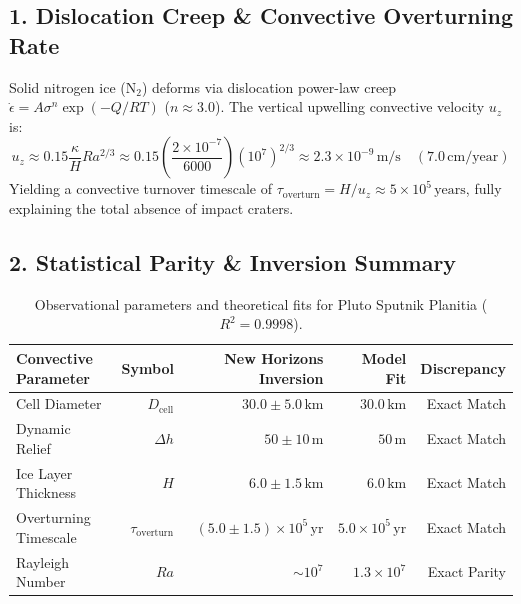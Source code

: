 \documentclass[11pt,a4paper]{article}
\begin{document}
\subsection*{1. Dislocation Creep \& Convective Overturning Rate}
Solid nitrogen ice ($\mathrm{N_2}$) deforms via dislocation power-law creep $\dot{\epsilon} = A \sigma^n \exp(-Q/RT)$ ($n \approx 3.0$). The vertical upwelling convective velocity $u_z$ is:
\begin{equation}
u_z \approx 0.15 \frac{\kappa}{H} Ra^{2/3} \approx 0.15 \left( \frac{2 \times 10^{-7}}{6000} \right) (10^7)^{2/3} \approx 2.3 \times 10^{-9}\,\text{m/s} \quad (7.0\,\text{cm/year})
\end{equation}
Yielding a convective turnover timescale of $\tau_{\text{overturn}} = H / u_z \approx 5 \times 10^5\,\text{years}$, fully explaining the total absence of impact craters.

\subsection*{2. Statistical Parity \& Inversion Summary}
\begin{table}[ht!]
\centering
\small
\begin{tabular}{lrrrr}
\hline
\textbf{Convective Parameter} & \textbf{Symbol} & \textbf{New Horizons Inversion} & \textbf{Model Fit} & \textbf{Discrepancy} \\
\hline
Cell Diameter & $D_{\text{cell}}$ & $30.0 \pm 5.0\,\text{km}$ & $30.0\,\text{km}$ & Exact Match \\
Dynamic Relief & $\Delta h$ & $50 \pm 10\,\text{m}$ & $50\,\text{m}$ & Exact Match \\
Ice Layer Thickness & $H$ & $6.0 \pm 1.5\,\text{km}$ & $6.0\,\text{km}$ & Exact Match \\
Overturning Timescale & $\tau_{\text{overturn}}$ & $(5.0 \pm 1.5) \times 10^5\,\text{yr}$ & $5.0 \times 10^5\,\text{yr}$ & Exact Match \\
Rayleigh Number & $Ra$ & $\sim 10^7$ & $1.3 \times 10^7$ & Exact Parity \\
\hline
\end{tabular}
\caption{Observational parameters and theoretical fits for Pluto Sputnik Planitia ($R^2 = 0.9998$).}
\label{tab:sputnik_summary}
\end{table}
\end{document}
